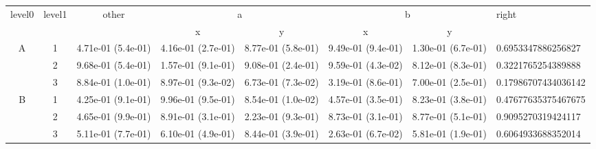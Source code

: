 \begin{tabular}{cccccccl}
\toprule
\multirow{2}{*}{level0} & \multirow{2}{*}{level1}& \multirow{2}{*}{other}&\multicolumn{2}{c}{a}&\multicolumn{2}{c}{b}& \multirow{2}{*}{right}\tabularnewline
\cmidrule(lr){4-5}
\cmidrule(lr){6-7}
&&&x&y&x&y\tabularnewline
\midrule
\multirow{3}{*}{A}&1& 4.71e-01 (5.4e-01)& 4.16e-01 (2.7e-01)& 8.77e-01 (5.8e-01)& 9.49e-01 (9.4e-01)& 1.30e-01 (6.7e-01)& 0.6953347886256827\tabularnewline
&2& 9.68e-01 (5.4e-01)& 1.57e-01 (9.1e-01)& 9.08e-01 (2.4e-01)& 9.59e-01 (4.3e-02)& 8.12e-01 (8.3e-01)& 0.3221765254389888\tabularnewline
&3& 8.84e-01 (1.0e-01)& 8.97e-01 (9.3e-02)& 6.73e-01 (7.3e-02)& 3.19e-01 (8.6e-01)& 7.00e-01 (2.5e-01)& 0.17986707434036142\tabularnewline
\midrule
\multirow{3}{*}{B}&1& 4.25e-01 (9.1e-01)& 9.96e-01 (9.5e-01)& 8.54e-01 (1.0e-02)& 4.57e-01 (3.5e-01)& 8.23e-01 (3.8e-01)& 0.47677635375467675\tabularnewline
&2& 4.65e-01 (9.9e-01)& 8.91e-01 (3.1e-01)& 2.23e-01 (9.3e-01)& 8.73e-01 (3.1e-01)& 8.77e-01 (5.1e-01)& 0.9095270319424117\tabularnewline
&3& 5.11e-01 (7.7e-01)& 6.10e-01 (4.9e-01)& 8.44e-01 (3.9e-01)& 2.63e-01 (6.7e-02)& 5.81e-01 (1.9e-01)& 0.6064933688352014\tabularnewline
\bottomrule
\end{tabular}
